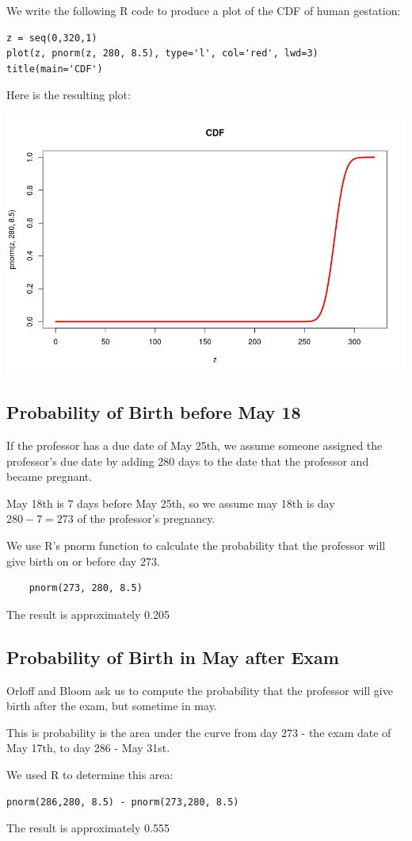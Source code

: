 \documentclass[a4paper,11pt]{article}
\begin{document}
We write the following R code to produce a plot of the CDF of human gestation:

\begin{lstlisting}
z = seq(0,320,1)
plot(z, pnorm(z, 280, 8.5), type='l', col='red', lwd=3)
title(main='CDF')
\end{lstlisting}

Here is the resulting plot:
\begin{center}
\includegraphics[scale=0.5]{cdf-gestation}
\end{center}

\subsection{Probability of Birth before May 18}

If the professor has a due date of May 25th, we assume someone assigned the
professor's due date by adding 280 days to the date that the professor and
became pregnant.

May 18th is 7 days before May 25th, so we assume may 18th is day $280-7=273$
of the professor's pregnancy.

We use R's pnorm function to calculate the probability that the professor will
give birth on or before day $273$.

\begin{lstlisting}
	pnorm(273, 280, 8.5)
\end{lstlisting}

The result is approximately 0.205

\subsection{Probability of Birth in May after Exam}

Orloff and Bloom ask us to compute the probability that the professor will give birth after the exam, but sometime in may.

This is probability is the area under the curve from day 273 
 - the exam date of May 17th, to
day 286 - May 31st.

We used R to determine this area:

\begin{lstlisting}
pnorm(286,280, 8.5) - pnorm(273,280, 8.5)
\end{lstlisting}

The result is approximately 0.555

\printbibliography{}
\end{document}
